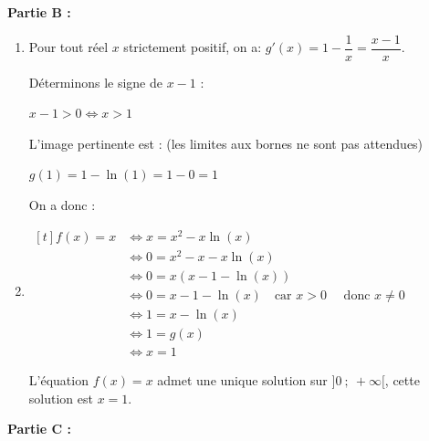 \textbf{Partie B :}

\medskip

\begin{enumerate}
	\item Pour tout réel $x$ strictement positif, on a: $g'(x) =1 - \dfrac{1}{x}= \dfrac{x-1}{x}$.

Déterminons le signe de $x-1$ :

$ x-1 >0 \iff x > 1 $

L'image pertinente est : (les limites aux bornes ne sont pas attendues)

$g(1)= 1-\ln(1)=1-0=1$

On a donc :

	\item $\begin{aligned}[t] f(x) = x &\iff x = x^2-x\ln(x) \\
	&\iff 0 = x^2-x-x\ln(x) \\
	&\iff 0 = x\left( x-1-\ln(x)\right)\\
	&\iff 0 = x-1-\ln(x) \quad \text{car } x>0 \quad \text{ donc } x\neq0 \\
	& \iff 1 = x-\ln(x)\\
	&\iff 1 = g(x)\\
	&\iff x = 1 \end{aligned}$

L'équation $f(x)=x$ admet une unique solution sur $]0~;~+\infty[$, cette solution est $x=1$.
\end{enumerate}

\medskip

\textbf{Partie C :}

\medskip

